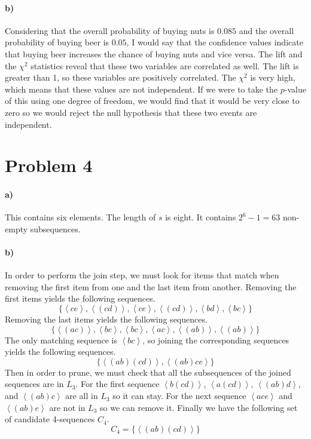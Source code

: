 \documentclass[12pt]{article}
\begin{document}
\paragraph{b)}

Considering that the overall probability of buying nuts is \(0.085\) and the overall probability of buying beer
is \(0.05\), I would say that the confidence values indicate that buying beer increases the chance of buying nuts and vice
versa. The lift and the \(\chi^2\) statistics reveal that these two variables are correlated as well. The lift is
greater than 1, so these variables are positively correlated. The \(\chi^2\) is very high, which means that these values
are not independent. If we were to take the \(p\)-value of this using one degree of freedom, we would find that it
would be very close to zero so we would reject the null hypothesis that these two events are independent.

\section*{Problem 4}

\paragraph{a)}

This contains six elements. The length of \(s\) is eight. It contains \(2^6-1=63\) non-empty subsequences.

\paragraph{b)}

In order to perform the join step, we must look for items that match when removing the first item from one
and the last item from another. Removing the first items yields the following sequences.
\[\{\left<ce\right>,\left<(cd)\right>,\left<ce\right>,\left<(cd)\right>,\left<bd\right>,\left<bc\right>\}\]
Removing the last items yields the following sequences.
\[\{\left<(ac)\right>,\left<bc\right>,\left<bc\right>,\left<ac\right>,\left<(ab)\right>,\left<(ab)\right>\}\]
The only matching sequence is \(\left<bc\right>\), so joining the corresponding sequences yields the following
sequences.
\[\{\left<(ab)(cd)\right>,\left<(ab)ce\right>\}\]
Then in order to prune, we must check that all the subsequences of the joined sequences are in \(L_3\). For
the first sequence \(\left<b(cd)\right>\), \(\left<a(cd)\right>\), \(\left<(ab)d\right>\), and \(\left<(ab)c\right>\)
are all in \(L_3\) so it can stay. For the next sequence \(\left<ace\right>\) and \(\left<(ab)e\right>\) are not
in \(L_3\) so we can remove it. Finally we have the following set of candidate 4-sequences \(C_4\).
\[C_4=\{\left<(ab)(cd)\right>\}\]
\end{document}
